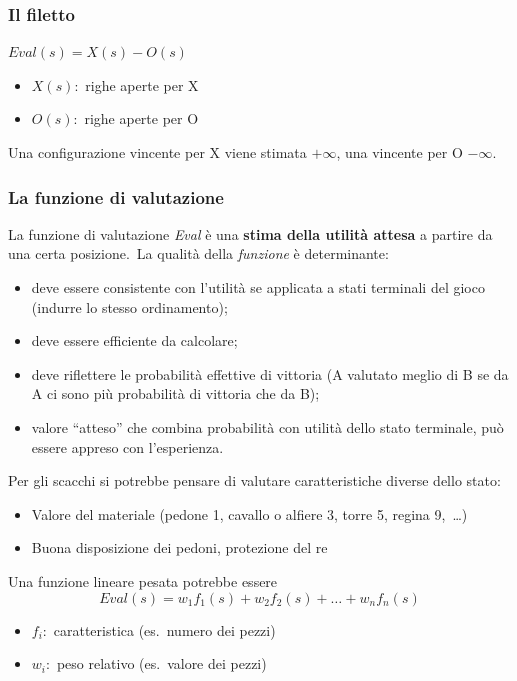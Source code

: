\subsubsection{Il filetto}

$Eval(s) = X(s) - O(s)$
\begin{itemize}
	\item $X(s)$:\ righe aperte per X
	\item $O(s)$:\ righe aperte per O
\end{itemize}
Una configurazione vincente per X viene stimata $+\infty$, una vincente per O $-\infty$.

\subsubsection{La funzione di valutazione}

La funzione di valutazione \textit{Eval} è una \textbf{stima della utilità attesa} a partire da una certa posizione.\
La qualità della \textit{funzione} è determinante:
\begin{itemize}
	\item deve essere consistente con l'utilità se applicata a stati terminali del gioco (indurre lo stesso ordinamento);
	\item deve essere efficiente da calcolare;
	\item deve riflettere le probabilità effettive di vittoria (A valutato meglio di B se da A ci sono più probabilità di vittoria che da B);
	\item valore ``atteso'' che combina probabilità con utilità dello stato terminale, può essere appreso con l'esperienza.
\end{itemize}

\noindent Per gli scacchi si potrebbe pensare di valutare caratteristiche diverse dello stato:
\begin{itemize}
	\item Valore del materiale (pedone 1, cavallo o alfiere 3, torre 5, regina 9,\ \dots)
	\item Buona disposizione dei pedoni, protezione del re
\end{itemize}

\noindent Una funzione lineare pesata potrebbe essere
\[
	Eval(s) = w_1 f_1(s) + w_2 f_2(s) + \dots + w_n f_n(s)
\]
\begin{itemize}
	\item []$f_i$:\ caratteristica (es.\ numero dei pezzi)
	\item[] $w_i$:\ peso relativo (es.\ valore dei pezzi)
\end{itemize}

